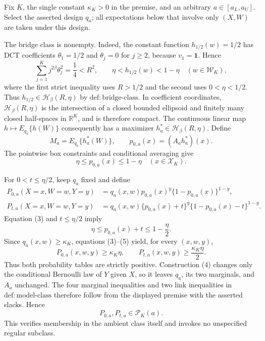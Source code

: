 Fix \(K\), the single constant \(\kappa_K>0\) in the premise, and an arbitrary \(a\in[a_L,a_U]\). Select the asserted design \(q_a\); all expectations below that involve only \((X,W)\) are taken under this design.

The bridge class is nonempty. Indeed, the constant function \(h_{1/2}(w)=1/2\) has DCT coefficients \(\theta_1=1/2\) and \(\theta_j=0\) for \(j\ge2\), because \(v_1=\mathbf 1\). Hence
\[
\sum_{j=1}^K j^{2\beta}\theta_j^2=\frac14<R^2,
\qquad
\eta<h_{1/2}(w)<1-\eta
\quad(w\in\mathcal W_K),
\tag{1}
\]
where the first strict inequality uses \(R>1/2\) and the second uses \(0<\eta<1/2\). Thus \(h_{1/2}\in\mathcal H_\beta(R,\eta)\) by \(\mathrm{def:bridge\mbox{-}class}\). In coefficient coordinates, \(\mathcal H_\beta(R,\eta)\) is the intersection of a closed bounded ellipsoid and finitely many closed half-spaces in \(\mathbb R^K\), and is therefore compact. The continuous linear map \(h\mapsto E_{q_a}\{h(W)\}\) consequently has a maximizer \(h_a^*\in\mathcal H_\beta(R,\eta)\). Define
\[
M_a=E_{q_a}\{h_a^*(W)\},
\qquad
p_{0,a}(x)=(A_ah_a^*)(x).
\tag{2}
\]
The pointwise box constraints and conditional averaging give
\[
\eta\le p_{0,a}(x)\le1-\eta
\quad(x\in\mathcal X_K).
\tag{3}
\]

For \(0<t\le\eta/2\), keep \(q_a\) fixed and define
\[
\begin{aligned}
P_{0,a}(X=x,W=w,Y=y)
&=q_a(x,w)p_{0,a}(x)^y\{1-p_{0,a}(x)\}^{1-y},\\
P_{t,a}(X=x,W=w,Y=y)
&=q_a(x,w)\{p_{0,a}(x)+t\}^y
  \{1-p_{0,a}(x)-t\}^{1-y}.
\end{aligned}
\tag{4}
\]
Equation (3) and \(t\le\eta/2\) imply
\[
\eta\le p_{0,a}(x)+t\le1-\frac\eta2.
\tag{5}
\]
Since \(q_a(x,w)\ge\kappa_K\), equations (3)--(5) yield, for every \((x,w,y)\),
\[
P_{0,a}(x,w,y)\ge\kappa_K\eta,
\qquad
P_{t,a}(x,w,y)\ge\frac{\kappa_K\eta}{2}.
\tag{6}
\]
Thus both probability tables are strictly positive. Construction (4) changes only the conditional Bernoulli law of \(Y\) given \(X\), so it leaves \(q_a\), its two marginals, and \(A_a\) unchanged. The four marginal inequalities and two link inequalities in \(\mathrm{def:model\mbox{-}class}\) therefore follow from the displayed premise with the asserted slacks. Hence
\[
P_{0,a},P_{t,a}\in\mathcal P_K(a).
\tag{7}
\]
This verifies membership in the ambient class itself and invokes no unspecified regular subclass.

